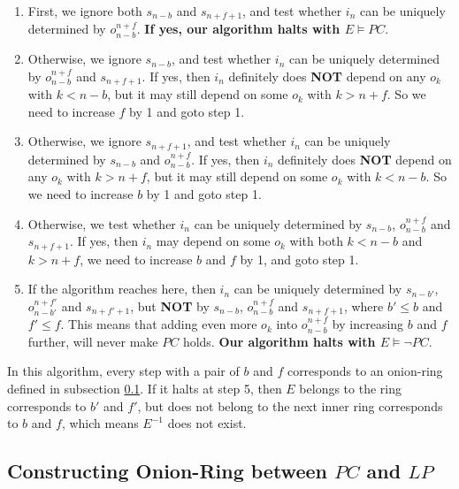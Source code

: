 \documentclass[journal]{IEEEtran}
\begin{document}
\begin{enumerate}
\item First,
we ignore both $s_{n-b}$ and $s_{n+f+1}$,
and test whether $i_n$ can be uniquely determined by $o_{n-b}^{n+f}$.
\textbf{If yes,
our algorithm halts with $E\vDash PC$}.

\item Otherwise,
we ignore $s_{n-b}$,
and test whether $i_n$ can be uniquely determined by $o_{n-b}^{n+f}$ and $s_{n+f+1}$.
If yes,
then $i_n$ definitely does \textbf{NOT} depend on any $o_k$ with $k<n-b$,
but it may still depend on some $o_k$ with $k>n+f$.
So we need to increase $f$ by 1 and goto step 1.

\item Otherwise,
we ignore $s_{n+f+1}$,
and test whether $i_n$ can be uniquely determined by $s_{n-b}$ and $o_{n-b}^{n+f}$.
If yes,
then $i_n$ definitely does \textbf{NOT} depend on any $o_k$ with $k>n+f$,
but it may still depend on some $o_k$ with $k<n-b$.
So we need to increase $b$ by 1 and goto step 1.

\item Otherwise,
we test whether $i_n$ can be uniquely determined by $s_{n-b}$, $o_{n-b}^{n+f}$ and $s_{n+f+1}$.
If yes,
then $i_n$ may depend on some $o_k$ with both $k<n-b$ and $k>n+f$,
we need to increase $b$ and $f$ by 1,
and goto step 1.

\item If the algorithm reaches here,
then $i_n$ can be uniquely determined by $s_{n-b'}$, $o_{n-b'}^{n+f'}$ and $s_{n+f'+1}$,
but \textbf{NOT} by $s_{n-b}$, $o_{n-b}^{n+f}$ and $s_{n+f+1}$,
where $b'\le b$ and $f'\le f$.
This means that adding even more $o_k$ into $o_{n-b}^{n+f}$ by increasing $b$ and $f$ further, will never make $PC$ holds.
\textbf{Our algorithm halts with $E\vDash\neg PC$}.
\end{enumerate}

In this algorithm,
every step with a pair of $b$ and $f$ corresponds to an onion-ring defined in subsection \ref{subsec_onionring}.
If it halts at step 5,
then $E$ belongs to the ring corresponds to $b'$ and $f'$,
but does not belong to the next inner ring corresponds to $b$ and $f$,
which means $E^{-1}$ does not exist.


\subsection{Constructing Onion-Ring between $PC$ and $LP$}\label{subsec_onionring}
\end{document}
